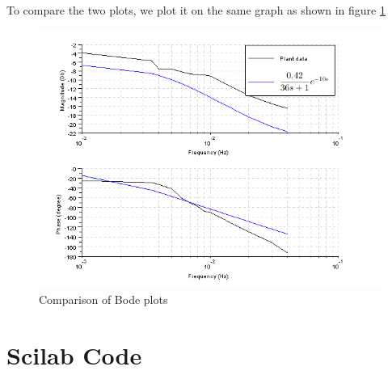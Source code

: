 To compare the two plots, we plot it on the same graph as shown in figure \ref{compare_bode}
\begin{figure}
\centering
\includegraphics[width=\linewidth]{sinetest_manual/bode_comparison}
\caption{Comparison of Bode plots}
\label{compare_bode}
\end{figure}



\section{Scilab Code}\label{sinecodes}

\begin{code}

\end{code}


\begin{code}

\end{code}

\begin{code}

\end{code}

\begin{code}

\end{code}


